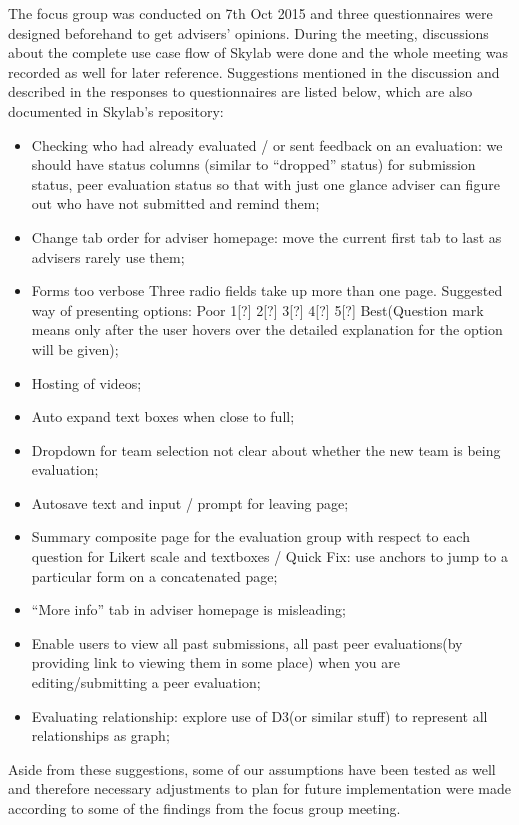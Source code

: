 The focus group was conducted on 7th Oct 2015 and three questionnaires were designed beforehand to get advisers' opinions. During the meeting, discussions about the complete use case flow of Skylab were done and the whole meeting was recorded as well for later reference. Suggestions mentioned in the discussion and described in the responses to questionnaires are listed below, which are also documented in Skylab's repository\cite{citationskylabfocusgroup}:

\begin{itemize}
  \item Checking who had already evaluated / or sent feedback on an evaluation: we should have status columns (similar to ``dropped'' status) for submission status, peer evaluation status so that with just one glance adviser can figure out who have not submitted and remind them;
  \item Change tab order for adviser homepage: move the current first tab to last as advisers rarely use them;
  \item Forms too verbose Three radio fields take up more than one page. Suggested way of presenting options: Poor 1[?] 2[?] 3[?] 4[?] 5[?] Best(Question mark means only after the user hovers over the detailed explanation for the option will be given);
  \item Hosting of videos;
  \item Auto expand text boxes when close to full;
  \item Dropdown for team selection not clear about whether the new team is being evaluation;
  \item Autosave text and input / prompt for leaving page;
  \item Summary composite page for the evaluation group with respect to each question for Likert scale and textboxes / Quick Fix: use anchors to jump to a particular form on a concatenated page;
  \item ``More info'' tab in adviser homepage is misleading;
  \item Enable users to view all past submissions, all past peer evaluations(by providing link to viewing them in some place) when you are editing/submitting a peer evaluation;
  \item Evaluating relationship: explore use of D3(or similar stuff) to represent all relationships as graph;
\end{itemize}

Aside from these suggestions, 
some of our assumptions have been tested as well and therefore necessary adjustments to plan for future implementation were made according to some of the findings from the focus group meeting.
